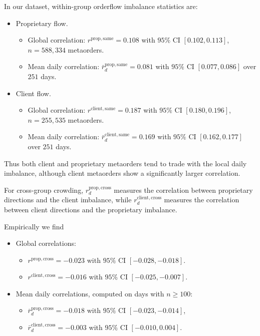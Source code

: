 \documentclass[11pt]{article}
\begin{document}
In our dataset, within-group orderflow imbalance statistics are:
\begin{itemize}
  \item Proprietary flow.
    \begin{itemize}
      \item Global correlation:
            \(r^{\mathrm{prop},\mathrm{same}} = 0.108\) with \(95\%\) CI
            \([0.102, 0.113]\), \(n = 588{,}334\) metaorders.
      \item Mean daily correlation:
            \(\bar r_d^{\mathrm{prop},\mathrm{same}} = 0.081\) with \(95\%\)
            CI \([0.077, 0.086]\) over \(251\) days.
    \end{itemize}

  \item Client flow.
    \begin{itemize}
      \item Global correlation:
            \(r^{\mathrm{client},\mathrm{same}} = 0.187\) with \(95\%\) CI
            \([0.180, 0.196]\), \(n = 255{,}535\) metaorders.
      \item Mean daily correlation:
            \(\bar r_d^{\mathrm{client},\mathrm{same}} = 0.169\) with \(95\%\)
            CI \([0.162, 0.177]\) over \(251\) days.
    \end{itemize}
\end{itemize}
Thus both client and proprietary metaorders tend to trade with the local daily
imbalance, although client metaorders show a significantly larger correlation.

For cross-group crowding, \(r_d^{\mathrm{prop},\mathrm{cross}}\) measures the
correlation between proprietary directions and the client imbalance, while
\(r_d^{\mathrm{client},\mathrm{cross}}\) measures the correlation between client
directions and the proprietary imbalance.

Empirically we find
\begin{itemize}
  \item Global correlations:
    \begin{itemize}
      \item \(r^{\mathrm{prop},\mathrm{cross}} = -0.023\) with \(95\%\) CI
            \([-0.028, -0.018]\).
      \item \(r^{\mathrm{client},\mathrm{cross}} = -0.016\) with \(95\%\) CI
            \([-0.025, -0.007]\).
    \end{itemize}
  \item Mean daily correlations, computed on days with \(n\ge 100\):
    \begin{itemize}
      \item \(\bar r_d^{\mathrm{prop},\mathrm{cross}} = -0.018\) with \(95\%\)
            CI \([-0.023, -0.014]\),
      \item \(\bar r_d^{\mathrm{client},\mathrm{cross}} = -0.003\) with \(95\%\)
            CI \([-0.010, 0.004]\).
    \end{itemize}
\end{itemize}
\end{document}
